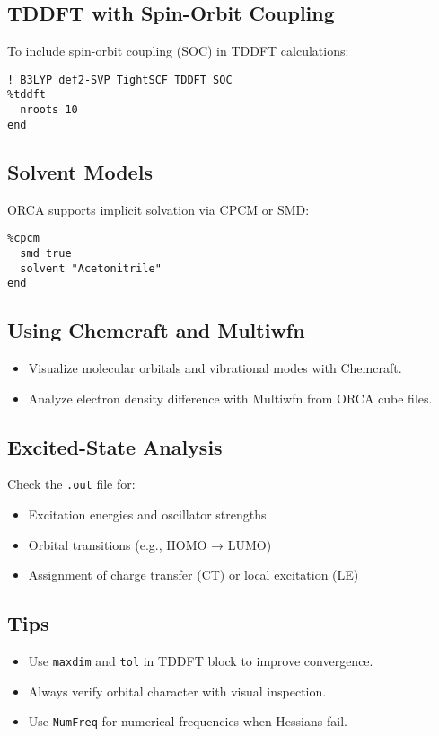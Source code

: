 \subsection*{TDDFT with Spin-Orbit Coupling}

To include spin-orbit coupling (SOC) in TDDFT calculations:

\begin{verbatim}
! B3LYP def2-SVP TightSCF TDDFT SOC
%tddft
  nroots 10
end
\end{verbatim}

\subsection*{Solvent Models}

ORCA supports implicit solvation via CPCM or SMD:

\begin{verbatim}
%cpcm
  smd true
  solvent "Acetonitrile"
end
\end{verbatim}

\subsection*{Using Chemcraft and Multiwfn}

\begin{itemize}
  \item Visualize molecular orbitals and vibrational modes with Chemcraft.
  \item Analyze electron density difference with Multiwfn from ORCA cube files.
\end{itemize}

\subsection*{Excited-State Analysis}

Check the \texttt{.out} file for:

\begin{itemize}
  \item Excitation energies and oscillator strengths
  \item Orbital transitions (e.g., HOMO → LUMO)
  \item Assignment of charge transfer (CT) or local excitation (LE)
\end{itemize}

\subsection*{Tips}

\begin{itemize}
  \item Use \texttt{maxdim} and \texttt{tol} in TDDFT block to improve convergence.
  \item Always verify orbital character with visual inspection.
  \item Use \texttt{NumFreq} for numerical frequencies when Hessians fail.
\end{itemize}
